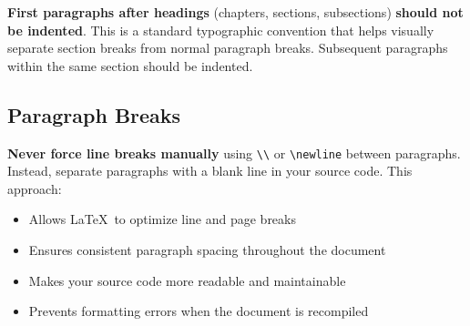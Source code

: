 \textbf{First paragraphs after headings} (chapters, sections, subsections) \textbf{should not be indented}. This is a standard typographic convention that helps visually separate section breaks from normal paragraph breaks. Subsequent paragraphs within the same section should be indented.

\subsection{Paragraph Breaks}
\label{subsec:paragraph-breaks}

\textbf{Never force line breaks manually} using \texttt{\textbackslash\textbackslash} or \texttt{\textbackslash newline} between paragraphs. Instead, separate paragraphs with a blank line in your source code. This approach:

\begin{itemize}
    \item Allows \LaTeX\ to optimize line and page breaks
    \item Ensures consistent paragraph spacing throughout the document
    \item Makes your source code more readable and maintainable
    \item Prevents formatting errors when the document is recompiled
\end{itemize}
